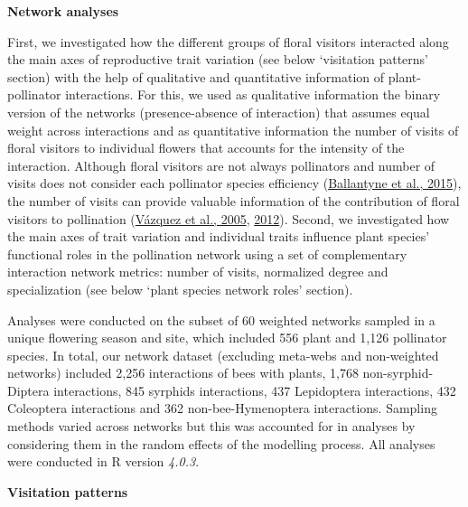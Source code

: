 \documentclass[
  12pt,
  a4paper,
]{article}
\begin{document}
\textbf{Network analyses}

First, we investigated how the different groups of floral visitors interacted along the main axes of reproductive trait variation (see below `visitation patterns' section) with the help of qualitative and quantitative information of plant-pollinator interactions. For this, we used as qualitative information the binary version of the networks (presence-absence of interaction) that assumes equal weight across interactions and as quantitative information the number of visits of floral visitors to individual flowers that accounts for the intensity of the interaction. Although floral visitors are not always pollinators and number of visits does not consider each pollinator species efficiency (\protect\hyperlink{ref-ballantyne2015}{Ballantyne et al., 2015}), the number of visits can provide valuable information of the contribution of floral visitors to pollination (\protect\hyperlink{ref-vazquez2005}{Vázquez et al., 2005}, \protect\hyperlink{ref-vazquez2012}{2012}). Second, we investigated how the main axes of trait variation and individual traits influence plant species' functional roles in the pollination network using a set of complementary interaction network metrics: number of visits, normalized degree and specialization (see below `plant species network roles' section).

Analyses were conducted on the subset of 60 weighted networks sampled in a unique flowering season and site, which included 556 plant and 1,126 pollinator species. In total, our network dataset (excluding meta-webs and non-weighted networks) included 2,256 interactions of bees with plants, 1,768 non-syrphid-Diptera interactions, 845 syrphids interactions, 437 Lepidoptera interactions, 432 Coleoptera interactions and 362 non-bee-Hymenoptera interactions. Sampling methods varied across networks but this was accounted for in analyses by considering them in the random effects of the modelling process. All analyses were conducted in R version \emph{4.0.3}.

\textbf{Visitation patterns}
\end{document}
